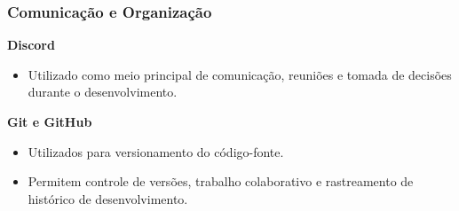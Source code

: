 \subsubsection{Comunicação e Organização}

\textbf{Discord}
\begin{itemize}
  \item Utilizado como meio principal de comunicação, reuniões e tomada de
        decisões durante o desenvolvimento.
\end{itemize}

\textbf{Git e GitHub}
\begin{itemize}
  \item Utilizados para versionamento do código-fonte.
  \item Permitem controle de versões, trabalho colaborativo e rastreamento de
        histórico de desenvolvimento.
\end{itemize}
